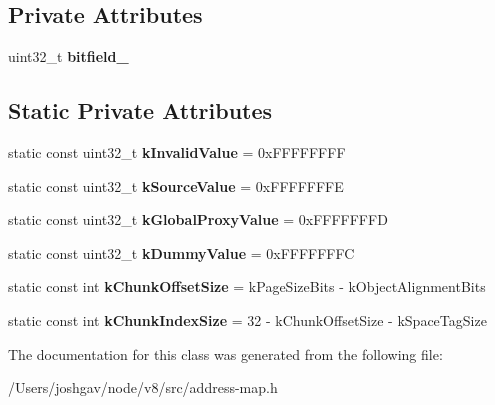 \subsection*{Private Attributes}
\begin{DoxyCompactItemize}
\item 
uint32\+\_\+t {\bfseries bitfield\+\_\+}\hypertarget{classv8_1_1internal_1_1_back_reference_aef2aafcadc28dd8f24549eaf3cc3f086}{}\label{classv8_1_1internal_1_1_back_reference_aef2aafcadc28dd8f24549eaf3cc3f086}

\end{DoxyCompactItemize}
\subsection*{Static Private Attributes}
\begin{DoxyCompactItemize}
\item 
static const uint32\+\_\+t {\bfseries k\+Invalid\+Value} = 0x\+F\+F\+F\+F\+F\+F\+FF\hypertarget{classv8_1_1internal_1_1_back_reference_a3d6b8548cfb7876b04db4d9aae007432}{}\label{classv8_1_1internal_1_1_back_reference_a3d6b8548cfb7876b04db4d9aae007432}

\item 
static const uint32\+\_\+t {\bfseries k\+Source\+Value} = 0x\+F\+F\+F\+F\+F\+F\+FE\hypertarget{classv8_1_1internal_1_1_back_reference_a834560ac80d077feb5aacc3362f55640}{}\label{classv8_1_1internal_1_1_back_reference_a834560ac80d077feb5aacc3362f55640}

\item 
static const uint32\+\_\+t {\bfseries k\+Global\+Proxy\+Value} = 0x\+F\+F\+F\+F\+F\+F\+FD\hypertarget{classv8_1_1internal_1_1_back_reference_a556a58c4e9df6c76324f784eb527101c}{}\label{classv8_1_1internal_1_1_back_reference_a556a58c4e9df6c76324f784eb527101c}

\item 
static const uint32\+\_\+t {\bfseries k\+Dummy\+Value} = 0x\+F\+F\+F\+F\+F\+F\+FC\hypertarget{classv8_1_1internal_1_1_back_reference_ab75e425e1a5972ce0cea7a292be8abf0}{}\label{classv8_1_1internal_1_1_back_reference_ab75e425e1a5972ce0cea7a292be8abf0}

\item 
static const int {\bfseries k\+Chunk\+Offset\+Size} = k\+Page\+Size\+Bits -\/ k\+Object\+Alignment\+Bits\hypertarget{classv8_1_1internal_1_1_back_reference_a4e1809773dc4c213254a3ae171a61329}{}\label{classv8_1_1internal_1_1_back_reference_a4e1809773dc4c213254a3ae171a61329}

\item 
static const int {\bfseries k\+Chunk\+Index\+Size} = 32 -\/ k\+Chunk\+Offset\+Size -\/ k\+Space\+Tag\+Size\hypertarget{classv8_1_1internal_1_1_back_reference_a61a1909af73872e4757b7d618fa72592}{}\label{classv8_1_1internal_1_1_back_reference_a61a1909af73872e4757b7d618fa72592}

\end{DoxyCompactItemize}


The documentation for this class was generated from the following file\+:\begin{DoxyCompactItemize}
\item 
/\+Users/joshgav/node/v8/src/address-\/map.\+h\end{DoxyCompactItemize}
